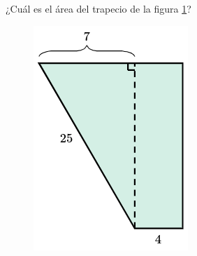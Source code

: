 ¿Cuál es el \'area del trapecio de la figura \ref{fig:area_compuesta_05}?

\begin{figure}[H]
    \begin{center}
        \includegraphics[width=0.2\linewidth]{../images/area_compuesta_05.png}
    \end{center}
    \caption{}
    \label{fig:area_compuesta_05}
\end{figure}
